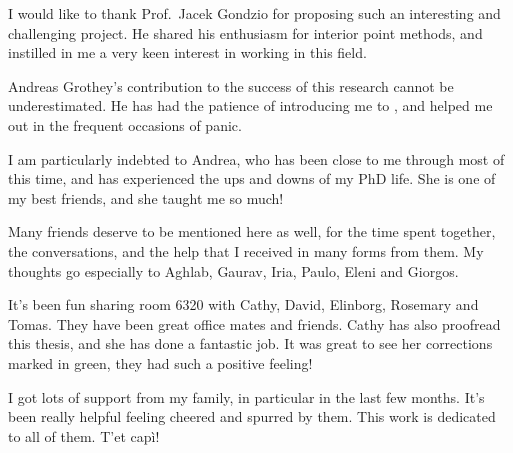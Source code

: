 
%
%

I would like to thank Prof.~Jacek Gondzio for proposing such an
interesting and challenging project. 
He shared his enthusiasm for interior point methods, and 
instilled in me a very keen interest in working in this field.

Andreas Grothey's contribution to the success of this research
cannot be underestimated. 
He has had the patience of introducing me to \OOPS, and helped me out
in the frequent occasions of panic.

I am particularly indebted to Andrea, who has been close to me through
most of this time, and has experienced the ups and downs of my PhD life.
She is one of my best friends, and she taught me so much!

Many friends deserve to be mentioned here as well, for the time spent together,
the conversations, and the help that I received in many forms from them.
My thoughts go especially to Aghlab, Gaurav, Iria, Paulo, Eleni and Giorgos. 

It's been fun sharing room 6320 with Cathy, David, Elinborg, Rosemary
and Tomas. They have been great office mates and
friends.
Cathy has also proofread this thesis, and she has done a fantastic job. 
It was great to see her corrections marked in green, they had such a 
positive feeling!

I got lots of support from my family, in particular in the last few months.
It's been really helpful feeling cheered and spurred by them.
This work is dedicated to all of them. T'et cap\`i!
